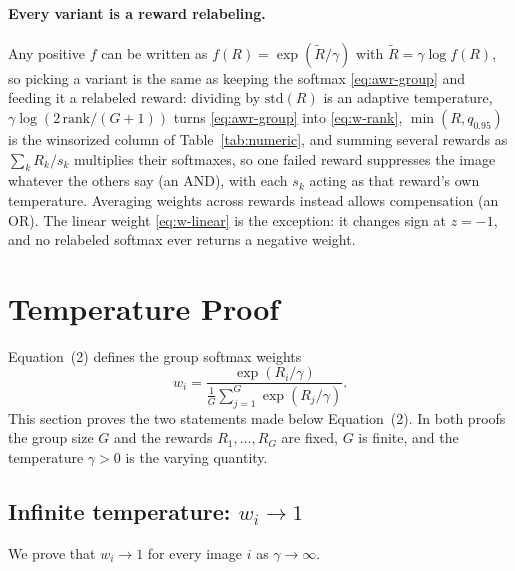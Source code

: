 \documentclass[10pt]{article} %
\begin{document}
\paragraph{Every variant is a reward relabeling.}
Any positive $f$ can be written as $f(R)=\exp(\tilde{R}/\gamma)$ with $\tilde{R}=\gamma\log f(R)$, so
picking a variant is the same as keeping the softmax \eqref{eq:awr-group} and feeding it a relabeled
reward: dividing by $\mathrm{std}(R)$ is an adaptive temperature, $\gamma\log(2\,\mathrm{rank}/(G{+}1))$
turns \eqref{eq:awr-group} into \eqref{eq:w-rank}, $\min(R,q_{0.95})$ is the winsorized column of
Table~\ref{tab:numeric}, and summing several rewards as $\sum_k R_k/s_k$ multiplies their softmaxes, so
one failed reward suppresses the image whatever the others say (an AND), with each $s_k$ acting as that
reward's own temperature. Averaging weights across rewards instead allows compensation (an OR). The
linear weight \eqref{eq:w-linear} is the exception: it changes sign at $z=-1$, and no relabeled
softmax ever returns a negative weight.




\section{Temperature Proof}
\label{sec:temperature-limits}

Equation~(2) defines the group softmax weights
\[
w_i=\frac{\exp(R_i/\gamma)}{\frac{1}{G}\sum_{j=1}^{G}\exp(R_j/\gamma)} .
\]
This section proves the two statements made below Equation~(2). In both proofs the group size $G$ and the rewards $R_1,\dots,R_G$ are fixed, $G$ is finite, and the temperature $\gamma>0$ is the varying quantity.

\subsection{Infinite temperature: $w_i \to 1$}

We prove that $w_i\to 1$ for every image $i$ as $\gamma\to\infty$.
\end{document}
